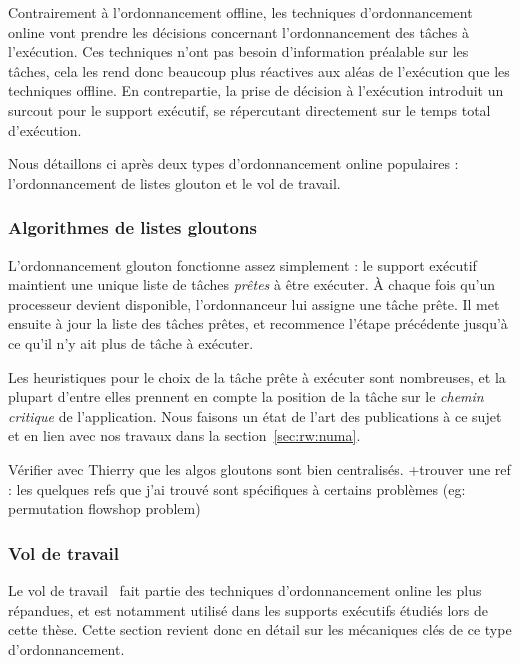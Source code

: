 Contrairement à l'ordonnancement offline, les techniques d'ordonnancement online vont prendre les décisions concernant l'ordonnancement des tâches à l'exécution.
Ces techniques n'ont pas besoin d'information préalable sur les tâches, cela les rend donc beaucoup plus réactives aux aléas de l'exécution que les techniques offline.
En contrepartie, la prise de décision à l'exécution introduit un surcout pour le support exécutif, se répercutant directement sur le temps total d'exécution.


Nous détaillons ci après deux types d'ordonnancement online populaires : l'ordonnancement de listes glouton et le vol de travail.

\subsubsection{Algorithmes de listes gloutons}

L'ordonnancement glouton fonctionne assez simplement : le support exécutif maintient une unique liste de tâches \emph{prêtes} à être exécuter.
À chaque fois qu'un processeur devient disponible, l'ordonnanceur lui assigne une tâche prête.
Il met ensuite à jour la liste des tâches prêtes, et recommence l'étape précédente jusqu'à ce qu'il n'y ait plus de tâche à exécuter.

Les heuristiques pour le choix de la tâche prête à exécuter sont nombreuses, et la plupart d'entre elles prennent en compte la position de la tâche sur le \emph{chemin critique} de l'application.
Nous faisons un état de l'art des publications à ce sujet et en lien avec nos travaux dans la section~\ref{sec:rw:numa}.

\begin{todo}
Vérifier avec Thierry que les algos gloutons sont bien centralisés.
+trouver une ref : les quelques refs que j'ai trouvé sont spécifiques à certains problèmes (eg: permutation flowshop problem)

\end{todo}

\subsubsection{Vol de travail}\label{sec:context:runtimes:ws}

Le vol de travail~\cite{Blumofe1999} fait partie des techniques d'ordonnancement online les plus répandues, et est notamment utilisé dans les supports exécutifs étudiés lors de cette thèse.
Cette section revient donc en détail sur les mécaniques clés de ce type d'ordonnancement.


